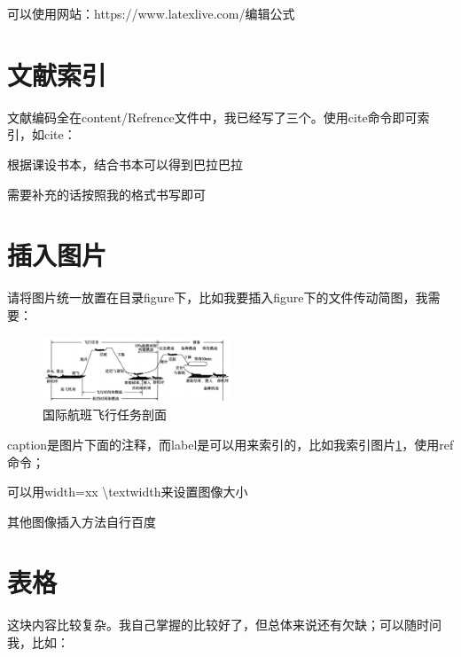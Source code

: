 可以使用网站：https://www.latexlive.com/编辑公式

\section{文献索引}

文献编码全在content/Refrence文件中，我已经写了三个。使用cite命令即可索引，如cite：

根据课设书本\cite{1}，结合书本\cite{2}可以得到巴拉巴拉

需要补充的话按照我的格式书写即可

\section{插入图片}

请将图片统一放置在目录figure下，比如我要插入figure下的文件传动简图，我需要：

\begin{figure}[H]  %
    \centering  %
    \includegraphics[width=0.5\textwidth]{figure/飞行任务剖面1.png}
    \caption{国际航班飞行任务剖面}
    \label{传动简图}
\end{figure}

caption是图片下面的注释，而label是可以用来索引的，比如我索引图片\ref{传动简图}，使用ref命令；

可以用width=xx \textbackslash textwidth来设置图像大小

其他图像插入方法自行百度

\section{表格}

这块内容比较复杂。我自己掌握的比较好了，但总体来说还有欠缺；可以随时问我，比如：

